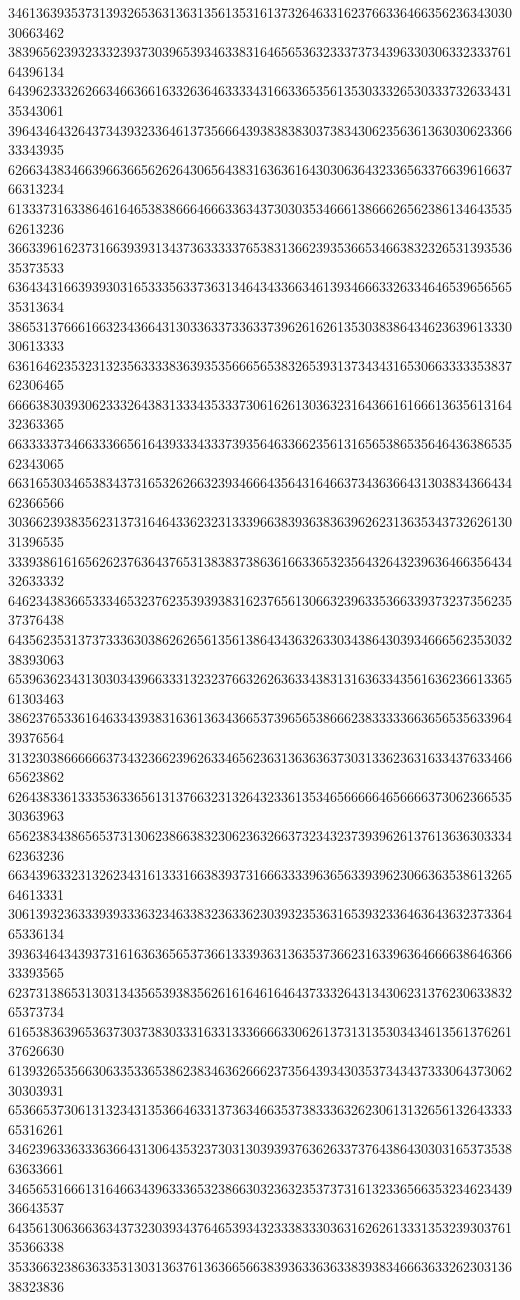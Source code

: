 34613639353731393265363136313561353161373264633162376633646635623634303030663462
38396562393233323937303965393463383164656536323337373439633030633233376164396134
64396233326266346636616332636463333431663365356135303332653033373263343135343061
39643464326437343932336461373566643938383830373834306235636136303062336633343935
62663438346639663665626264306564383163636164303063643233656337663961663766313234
61333731633864616465383866646663363437303035346661386662656238613464353562613236
36633961623731663939313437363333376538313662393536653466383232653139353635373533
63643431663939303165333563373631346434336634613934666332633464653965656535313634
38653137666166323436643130336337336337396261626135303838643462363961333030613333
63616462353231323563333836393535666565383265393137343431653066333335383762306465
66663830393062333264383133343533373061626130363231643661616661363561316432363365
66333337346633366561643933343337393564633662356131656538653564643638653562343065
66316530346538343731653262663239346664356431646637343636643130383436643462366566
30366239383562313731646433623231333966383936383639626231363534373262613031396535
33393861616562623763643765313838373863616633653235643264323963646635643432633332
64623438366533346532376235393938316237656130663239633536633937323735623537376438
64356235313737333630386262656135613864343632633034386430393466656235303238393063
65396362343130303439663331323237663262636334383131636334356163623661336561303463
38623765336164633439383163613634366537396565386662383333366365653563396439376564
31323038666666373432366239626334656236313636363730313362363163343763346665623862
62643833613335363365613137663231326432336135346566666465666637306236653530363963
65623834386565373130623866383230623632663732343237393962613761363630333462363236
66343963323132623431613331663839373166633339636563393962306636353861326564613331
30613932363339393336323463383236336230393235363165393233646364363237336465336134
39363464343937316163636565373661333936313635373662316339636466663864636633393565
62373138653130313435653938356261616461646437333264313430623137623063383265373734
61653836396536373037383033316331333666633062613731313530343461356137626137626630
61393265356630633533653862383463626662373564393430353734343733306437306230303931
65366537306131323431353664633137363466353738333632623061313265613264333365316261
34623963363336366431306435323730313039393763626337376438643030316537353863633661
34656531666131646634396333653238663032363235373731613233656635323462343936643537
64356130636636343732303934376465393432333833303631626261333135323930376135366338
35336632386363353130313637613636656638393633636338393834666363326230313638323836
